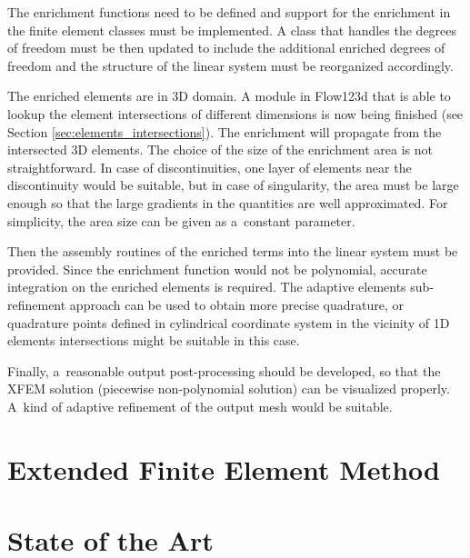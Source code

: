 \documentclass[dvipsnames,FM,Dis]{tulthesis}
\begin{document}
The enrichment functions need to be defined and support for the enrichment in the finite element classes must be implemented. 
A class that handles the degrees of freedom must be then updated to include the additional enriched degrees of freedom
and the structure of the linear system must be reorganized accordingly.

The enriched elements are in 3D domain. A module in Flow123d that is able to lookup the element intersections
of different dimensions is now being finished (see Section \ref{sec:elements_intersections}). The enrichment will propagate from the intersected 3D elements.
The choice of the size of the enrichment area is not straightforward. In case of discontinuities, one layer of elements
near the discontinuity would be suitable, but in case of singularity, the area must be large enough so that 
the large gradients in the quantities are well approximated. For simplicity, the area size can be given as
a~constant parameter.

Then the assembly routines of the enriched terms into the linear system must be provided.
Since the enrichment function would not be polynomial, accurate integration on the enriched elements is required. 
The adaptive elements sub-refinement approach can be used to obtain more precise quadrature, 
or quadrature points defined in cylindrical coordinate system in the vicinity of 1D elements intersections
might be suitable in this case.

Finally, a~reasonable output post-processing should be developed, so that the XFEM solution (piecewise non-polynomial solution)
can be visualized properly. A~kind of adaptive refinement of the output mesh would be suitable.



\chapter{Extended Finite Element Method} \label{chap:results}





\chapter{State of the Art} \label{chap:soa}
\end{document}
